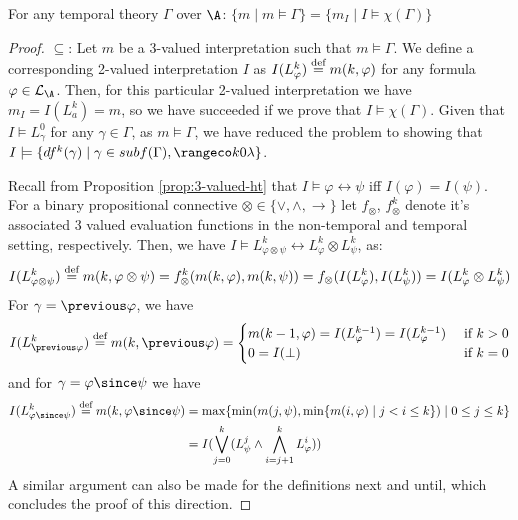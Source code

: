 \begin{theorem}\label{theorem:translation}
For any temporal theory $\Gamma$ over $\A$: \quad
$\{ m \mid m \models \Gamma \} = \{ m_I \mid I \models \chi(\Gamma) \}$
\end{theorem}
\begin{proof}
  $\subseteq$: Let $m$ be a 3-valued interpretation such that
  $m \models \Gamma$. We define a corresponding 2-valued
  interpretation $I$ as $I(L^k_\varphi) \stackrel{\text{def}}{=} m(k,\varphi)$ for any
  formula $\varphi \in \mathcal{L}_\A$. Then, for this particular
  2-valued interpretation we have $m_I=I(L_a^k)=m$, so we have
  succeeded if we prove that $I \models \chi(\Gamma)$. Given that
  $I \models L^0_\gamma$ for any $\gamma \in \Gamma$, as
  $m \models \Gamma$, we have reduced the problem to showing that
  $I \models \{ df^k(\gamma) \mid \gamma \in subf(\Gamma), \kinlambda
  \}$.

  Recall from Proposition \ref{prop:3-valued-ht} that
  $I \models \varphi \leftrightarrow \psi$ iff $I(\varphi) =
  I(\psi)$. For a binary propositional connective
  $\otimes \in \{ \vee, \wedge, \rightarrow \}$ let $f_{\otimes}$,
  $f_{\otimes}^k$ denote it's associated 3 valued evaluation functions
  in the non-temporal and temporal setting, respectively. Then, we
  have
  $I \models L^k_{\varphi \otimes \psi} \leftrightarrow L^k_\varphi
  \otimes L^k_\psi$, as:
  $$
  I(L^k_{\varphi \otimes \psi}) \stackrel{\text{def}}{=} m(k,\varphi \otimes \psi) 
  = f_{\otimes}^k(m(k,\varphi),m(k,\psi)) = f_{\otimes}(I(L^k_\varphi),I(L^k_\psi)) = I(L^k_{\varphi} \otimes L^k_{\psi})
  $$
  For $\gamma=\previous \varphi$, we have
  $$
  I(L^k_{\previous \varphi}) \defeq m(k,\previous \varphi) = \begin{cases}
    m(k-1,\varphi)=I(L^{k-1}_\varphi)=I(L^{k-1}_\varphi) &\text{ if } k > 0\\
    0=I(\bot) &\text{ if } k = 0
    \end{cases}
  $$
  and for $\gamma=\varphi \since \psi$ we have
  \begin{align*}
  I(L^k_{\varphi \since \psi}) \defeq m(k,\varphi \since \psi) &= \max \{\min (m(j, \psi), \min \{m(i, \varphi) \mid j<i \leq k\}) \mid 0 \leq j \leq k\} \\
    &= I(\bigvee_{j=0}^{k}(L_\psi^j \wedge \bigwedge_{i=j+1}^{k}L_{\varphi}^i))
  \end{align*}
  A similar argument can also be made for the definitions next and
  until, which concludes the proof of this direction.


\end{proof}
